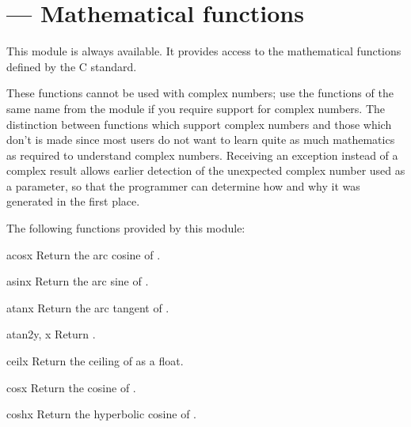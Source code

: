 \section{ ---
         Mathematical functions}


This module is always available.  It provides access to the
mathematical functions defined by the C standard.

These functions cannot be used with complex numbers; use the functions
of the same name from the  module if you require
support for complex numbers.  The distinction between functions which
support complex numbers and those which don't is made since most users
do not want to learn quite as much mathematics as required to
understand complex numbers.  Receiving an exception instead of a
complex result allows earlier detection of the unexpected complex
number used as a parameter, so that the programmer can determine how
and why it was generated in the first place.

The following functions provided by this module:

\begin{funcdesc}{acos}{x}
Return the arc cosine of .
\end{funcdesc}

\begin{funcdesc}{asin}{x}
Return the arc sine of .
\end{funcdesc}

\begin{funcdesc}{atan}{x}
Return the arc tangent of .
\end{funcdesc}

\begin{funcdesc}{atan2}{y, x}
Return .
\end{funcdesc}

\begin{funcdesc}{ceil}{x}
Return the ceiling of  as a float.
\end{funcdesc}

\begin{funcdesc}{cos}{x}
Return the cosine of .
\end{funcdesc}

\begin{funcdesc}{cosh}{x}
Return the hyperbolic cosine of .
\end{funcdesc}

